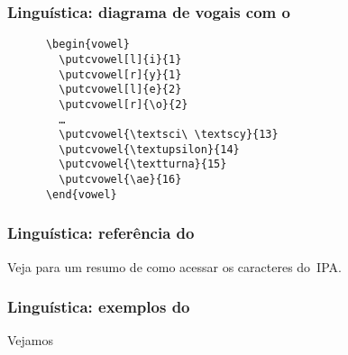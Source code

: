 \begin{frame}[fragile]
  \frametitle{Linguística: diagrama de vogais com o }
  \large
  \begin{minipage}{.45\textwidth}
    \begin{verbatim}
      \begin{vowel}
        \putcvowel[l]{i}{1}
        \putcvowel[r]{y}{1}
        \putcvowel[l]{e}{2}
        \putcvowel[r]{\o}{2}
        …
        \putcvowel{\textsci\ \textscy}{13}
        \putcvowel{\textupsilon}{14}
        \putcvowel{\textturna}{15}
        \putcvowel{\ae}{16}
      \end{vowel}
    \end{verbatim}
  \end{minipage}
  \hfill
  \begin{minipage}{.45\textwidth}
    \begin{vowel}
    \end{vowel}
  \end{minipage}
\end{frame}

\begin{frame}
  \frametitle{Linguística: referência do }
  \huge
  Veja  para um resumo de como acessar os
  caracteres do~IPA.
\end{frame}

\begin{frame}
  \frametitle{Linguística: exemplos do }
  \huge
  Vejamos 
\end{frame}

